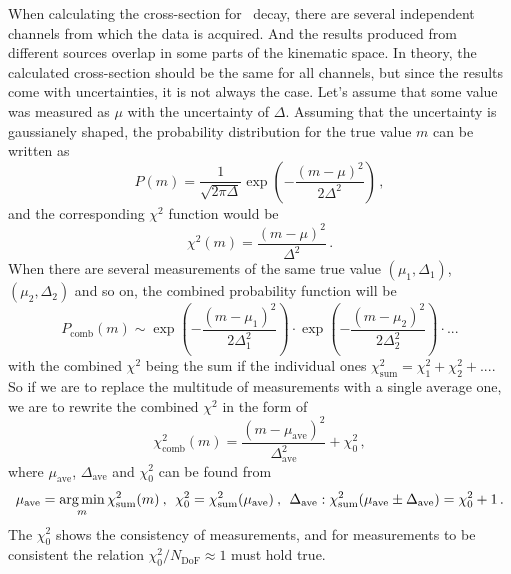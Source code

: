 When calculating the cross-section for \Zll\ decay, there are several independent channels from which the data is acquired. And the results produced from different sources overlap in some parts of the kinematic space. In theory, the calculated cross-section should be the same for all channels, but since the results come with uncertainties, it is not always the case. Let's assume that some value was measured as $\mu$ with the uncertainty of $\Delta$. Assuming that the uncertainty is gaussianely shaped, the probability distribution for the true value $m$ can be written as
\begin{equation}
P(m) = \frac{1}{\sqrt{2\pi\Delta}}\exp\left(-\frac{(m-\mu)^2}{2\Delta^2}\right) \,,
\end{equation}
and the corresponding $\chi^2$ function would be
\begin{equation}
\chi^2(m) = \frac{(m-\mu)^2}{\Delta^2} \,.
\end{equation}
When there are several measurements of the same true value $(\mu_1, \Delta_1)$, $(\mu_2, \Delta_2)$ and so on, the combined probability function will be
\begin{equation}
P_\mathrm{comb}(m) \sim \exp\left(-\frac{(m-\mu_1)^2}{2\Delta_1^2}\right) \cdot \exp\left(-\frac{(m-\mu_2)^2}{2\Delta_2^2}\right) \cdot ...
\end{equation}
with the combined $\chi^2$ being the sum if the individual ones $\chi^2_\mathrm{sum} = \chi^2_1 + \chi^2_2 + ...$. So if we are to replace the multitude of measurements with a single average one, we are to rewrite the combined $\chi^2$ in the form of
\begin{equation}
\chi^2_\mathrm{comb}(m) = \frac{(m-\mu_\mathrm{ave})^2}{\Delta_\mathrm{ave}^2} + \chi^2_0\,,
\end{equation}
where $\mu_\mathrm{ave}$, $\Delta_\mathrm{ave}$ and $\chi^2_0$ can be found from
\begin{equation}
\mu_\mathrm{ave} = \operatorname*{arg\,min}_m \chi^2_\mathrm{sum}(m) \:,\:\: \chi^2_0 = \chi^2_\mathrm{sum}(\mu_\mathrm{ave}) \:,\:\:\Delta_\mathrm{ave}: \chi^2_\mathrm{sum}(\mu_\mathrm{ave}\pm\Delta_\mathrm{ave})=\chi^2_0+1 \,.
\end{equation}
The $\chi^2_0$ shows the consistency of measurements, and for measurements to be consistent the relation $\chi^2_0 / N_\mathrm{DoF} \approx 1$ must hold true.

